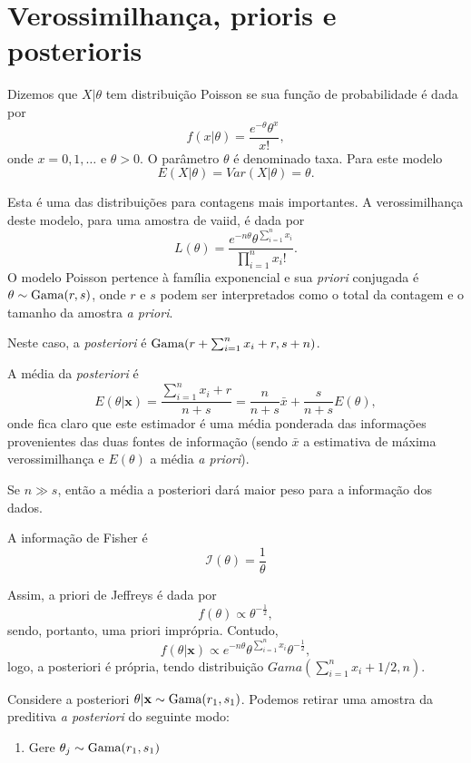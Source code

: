 \documentclass[
  letterpaper,
  DIV=11,
  numbers=noendperiod]{scrreprt}
\providecommand{\tightlist}{%
  \setlength{\itemsep}{0pt}\setlength{\parskip}{0pt}}\usepackage{longtable,booktabs,array}
\theoremstyle{definition}
\theoremstyle{definition}
\theoremstyle{remark}
\begin{document}
\hypertarget{verossimilhanuxe7a-prioris-e-posterioris}{%
\section{Verossimilhança, prioris e
posterioris}\label{verossimilhanuxe7a-prioris-e-posterioris}}

Dizemos que \(X|\theta\) tem distribuição Poisson se sua função de
probabilidade é dada por \[f(x|\theta)=\frac{e^{-\theta}\theta^x}{x!},\]
onde \(x=0,1,\ldots\) e \(\theta>0\). O parâmetro \(\theta\) é
denominado taxa. Para este modelo \[E(X|\theta)=Var(X|\theta)=\theta.\]

Esta é uma das distribuições para contagens mais importantes. A
verossimilhança deste modelo, para uma amostra de vaiid, é dada por
\[L(\theta)=\frac{e^{-n\theta}\theta^{\sum_{i=1}^{n}x_i}}{\prod_{i=1}^{n}x_i!}.\]
O modelo Poisson pertence à família exponencial e sua \textit{priori}
conjugada é \(\theta\sim\hbox{Gama}(r,s)\), onde \(r\) e \(s\) podem ser
interpretados como o total da contagem e o tamanho da amostra
\textit{a priori}.

Neste caso, a \textit{posteriori} é
\(\hbox{Gama}(r+\sum_{i=1}^n x_i+r, s+n)\).

A média da \textit{posteriori} é
\[E(\theta|\mathbf{x})=\frac{\sum_{i=1}^{n}x_i+r}{n+s}=\frac{n}{n+s}\bar{x}+\frac{s}{n+s}E(\theta),\]
onde fica claro que este estimador é uma média ponderada das informações
provenientes das duas fontes de informação (sendo \(\bar{x}\) a
estimativa de máxima verossimilhança e \(E(\theta)\) a média
\textit{a priori}).

Se \(n\gg s\), então a média a posteriori dará maior peso para a
informação dos dados.

A informação de Fisher é \[\mathcal{I}(\theta)=\frac{1}{\theta}\]

Assim, a priori de Jeffreys é dada por
\[f(\theta)\propto \theta^{-\frac{1}{2}},\] sendo, portanto, uma priori
imprópria. Contudo,
\[f(\theta|\mathbf{x})\propto e^{-n\theta}\theta^{\sum_{i=1}^{n}x_i} \theta^{-\frac{1}{2}},\]
logo, a posteriori é própria, tendo distribuição
\(Gama(\sum_{i=1}^{n}x_i+1/2,n)\).

Considere a posteriori \(\theta|\mathbf{x}\sim\hbox{Gama}(r_1,s_1)\).
Podemos retirar uma amostra da preditiva \textit{a posteriori} do
seguinte modo:

\begin{enumerate}
\def\labelenumi{\arabic{enumi}.}
\tightlist
\item
  Gere \(\theta_j\sim\hbox{Gama}(r_1,s_1)\)
\end{enumerate}
\end{document}
